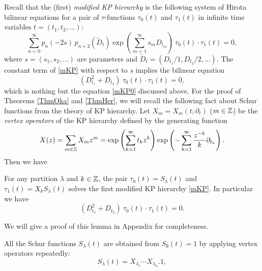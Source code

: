 \par\medskip
Recall that the (first) {\em modified  KP hierarchy} \cite{JM}
is the following system of Hirota bilinear equations 
for a pair of $\tau$-functions 
$\tau_0(t)$  and $\tau_1(t)$ in infinite time 
variables $t=(t_1,t_2,\ldots)$: 
\begin{equation}\label{mKP}
\sum_{n=0}^\infty p_n(-2s)\,p_{n+2}(\widetilde{D}_t)
\exp\left(\sum_{m=1}^\infty s_m D_{t_m} \right)\ 
\tau_{0}(t) \cdot \tau_{1}(t)=0, 
\end{equation}
where $s=(s_1,s_2,\ldots)$ are parameters 
and $\widetilde{D}_t=(D_{t_1}/1,D_{t_2}/2,\ldots)$. 
The constant term of \eqref{mKP} with respect to $s$ 
implies the bilinear equation
\begin{equation}
(D_{t_1}^2+D_{t_2})\  \tau_0(t)\cdot \tau_{1}(t)=0, 
\end{equation}
which is nothing but the equation \eqref{mKP0} discussed above. 
For the proof of Theorems \ref{ThmOka} and \ref{ThmHer}, 
we will recall the following fact about Schur functions 
from the theory of KP hierarchy. 
Let $X_m=X_m(t;\partial_t)$ ($m\in {\Bbb Z}$) be the 
{\em vertex operators} of the KP hierarchy defined by the generating 
function
\begin{equation}
X(z)=\sum_{m\in {\Bbb Z}} X_m z^m=
\exp\left(\sum_{k=1}^\infty t_k z^k\right)
\exp\left(-\sum_{k=1}^\infty \frac{z^{-k}}{k}\partial_{t_k} \right). 
\end{equation}
Then we have 
\begin{lem}\label{Lem52}
For any partition $\lambda$ and $k \in {\Bbb Z}$, the pair
$\tau_0(t)=S_{\lambda}(t)$ and  
$\tau_1(t)=X_k S_{\lambda}(t)$ solves the first modified KP
hierarchy \eqref{mKP}.
In particular we have
\begin{equation}
(D_{t_1}^2+D_{t_2})\  \tau_0(t)\cdot \tau_1(t)=0.
\end{equation}
\end{lem}
\medskip\noindent
We will give a proof of this lemma in Appendix for completeness. 
\par\medskip
All the Schur functions $S_{\lambda}(t)$ are obtained 
from $S_\emptyset(t)=1$ by applying vertex operators
repeatedly:
\begin{equation}\label{SinX}
S_{\lambda}(t)=
X_{\lambda_1}\cdots X_{\lambda_n}.1,
\end{equation}

